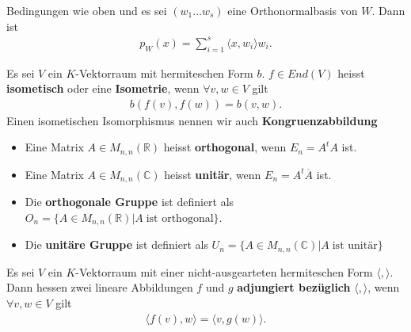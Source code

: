 \documentclass[../Algebra_script.tex]{subfiles}
\begin{document}
    \begin{proposition}
        Bedingungen wie oben und es sei $(w_1 \ldots w_{s})$ eine Orthonormalbasis von $W$. Dann ist 
        \begin{align*}
            p_{W}(x) = \sum_{i=1}^{s} \langle x, w_{i} \rangle w_{i}
        .\end{align*}
    \end{proposition}
    
    \begin{definition}[Isometrie]
        Es sei $V$ ein $K$-Vektorraum mit hermiteschen Form $b$. $f \in End(V)$ heisst \textbf{isometisch} oder eine \textbf{Isometrie}, wenn $\forall v, w \in
        V$ gilt
        \begin{align*}
            b(f(v), f(w)) = b(v, w)
        .\end{align*}
        Einen isometischen Isomorphismus nennen wir auch \textbf{Kongruenzabbildung}
    \end{definition}

    \begin{definition}
        \begin{itemize}
            \item Eine Matrix $A \in M_{n,n}(\mathbb{R})$ heisst \textbf{orthogonal}, wenn $E_{n} = A^{t}A$ ist.
            \item Eine Matrix $A \in M_{n,n}(\mathbb{C})$ heisst \textbf{unitär}, wenn $E_{n} = A^{t}\overline{A}$ ist.
            \item Die \textbf{orthogonale Gruppe} ist definiert als  $O_{n}=\{A \in M_{n,n}(\mathbb{R}) | A \;\text{ist orthogonal}\}$.
            \item Die \textbf{unitäre Gruppe} ist definiert als $U_{n}=\{A \in M_{n,n}(\mathbb{C}) | A \; \text{ist unitär}\}$
        \end{itemize}
    \end{definition}

    \begin{definition}
        Es sei $V$ ein $K$-Vektorraum mit einer nicht-ausgearteten hermiteschen Form $\langle,\rangle$. Dann hessen zwei lineare Abbildungen $f$ und $g$
        \textbf{adjungiert bezüglich} $\langle, \rangle$, wenn $\forall v, w \in V$ gilt
        \begin{align*}
            \langle f(v), w \rangle = \langle v, g(w) \rangle
        .\end{align*}
    \end{definition}
\end{document}
